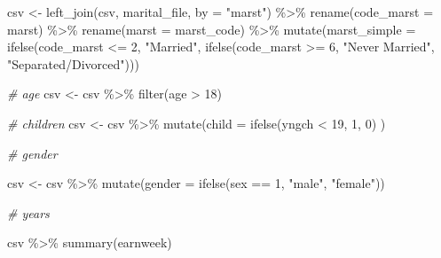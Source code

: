 \documentclass[
]{article}
\newenvironment{Shaded}{\begin{snugshade}}{\end{snugshade}}
\newcommand{\AttributeTok}[1]{\textcolor[rgb]{0.77,0.63,0.00}{#1}}
\newcommand{\CommentTok}[1]{\textcolor[rgb]{0.56,0.35,0.01}{\textit{#1}}}
\newcommand{\DecValTok}[1]{\textcolor[rgb]{0.00,0.00,0.81}{#1}}
\newcommand{\FunctionTok}[1]{\textcolor[rgb]{0.00,0.00,0.00}{#1}}
\newcommand{\NormalTok}[1]{#1}
\newcommand{\OtherTok}[1]{\textcolor[rgb]{0.56,0.35,0.01}{#1}}
\newcommand{\SpecialCharTok}[1]{\textcolor[rgb]{0.00,0.00,0.00}{#1}}
\newcommand{\StringTok}[1]{\textcolor[rgb]{0.31,0.60,0.02}{#1}}
\begin{document}
\begin{Shaded}
\begin{Highlighting}[]
\NormalTok{csv }\OtherTok{\textless{}{-}} \FunctionTok{left\_join}\NormalTok{(csv, marital\_file, }\AttributeTok{by =} \StringTok{"marst"}\NormalTok{) }\SpecialCharTok{\%\textgreater{}\%}
  \FunctionTok{rename}\NormalTok{(}\AttributeTok{code\_marst =}\NormalTok{ marst) }\SpecialCharTok{\%\textgreater{}\%}
  \FunctionTok{rename}\NormalTok{(}\AttributeTok{marst =}\NormalTok{ marst\_code) }\SpecialCharTok{\%\textgreater{}\%}
  \FunctionTok{mutate}\NormalTok{(}\AttributeTok{marst\_simple =} \FunctionTok{ifelse}\NormalTok{(code\_marst }\SpecialCharTok{\textless{}=} \DecValTok{2}\NormalTok{, }\StringTok{"Married"}\NormalTok{, }\FunctionTok{ifelse}\NormalTok{(code\_marst }\SpecialCharTok{\textgreater{}=} \DecValTok{6}\NormalTok{, }\StringTok{"Never Married"}\NormalTok{, }\StringTok{"Separated/Divorced"}\NormalTok{)))}



\CommentTok{\# age}
\NormalTok{csv }\OtherTok{\textless{}{-}}\NormalTok{ csv }\SpecialCharTok{\%\textgreater{}\%}
  \FunctionTok{filter}\NormalTok{(age }\SpecialCharTok{\textgreater{}} \DecValTok{18}\NormalTok{)}

\CommentTok{\# children}
\NormalTok{csv }\OtherTok{\textless{}{-}}\NormalTok{ csv }\SpecialCharTok{\%\textgreater{}\%}
  \FunctionTok{mutate}\NormalTok{(}\AttributeTok{child =} \FunctionTok{ifelse}\NormalTok{(yngch }\SpecialCharTok{\textless{}} \DecValTok{19}\NormalTok{, }\DecValTok{1}\NormalTok{, }\DecValTok{0}\NormalTok{) )}

\CommentTok{\# gender}

\NormalTok{csv }\OtherTok{\textless{}{-}}\NormalTok{ csv }\SpecialCharTok{\%\textgreater{}\%}
  \FunctionTok{mutate}\NormalTok{(}\AttributeTok{gender =} \FunctionTok{ifelse}\NormalTok{(sex }\SpecialCharTok{==} \DecValTok{1}\NormalTok{, }\StringTok{"male"}\NormalTok{, }\StringTok{"female"}\NormalTok{)) }

\CommentTok{\# years }

\NormalTok{csv }\SpecialCharTok{\%\textgreater{}\%}
  \FunctionTok{summary}\NormalTok{(earnweek)}
\end{Highlighting}
\end{Shaded}
\end{document}

